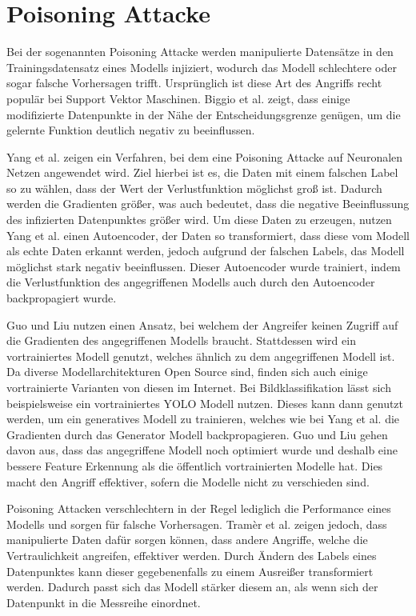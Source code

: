 \section{Poisoning Attacke}\label{sec:poisoning}

Bei der sogenannten Poisoning Attacke werden manipulierte Datensätze in den Trainingsdatensatz eines Modells injiziert, wodurch das Modell schlechtere oder sogar falsche Vorhersagen trifft.
Ursprünglich ist diese Art des Angriffs recht populär bei Support Vektor Maschinen.
Biggio et al. \cite{P-15} zeigt, dass einige modifizierte Datenpunkte in der Nähe der Entscheidungsgrenze genügen, um die gelernte Funktion deutlich negativ zu beeinflussen.

Yang et al. \cite{P-17} zeigen ein Verfahren, bei dem eine Poisoning Attacke auf Neuronalen Netzen angewendet wird.
Ziel hierbei ist es, die Daten mit einem falschen Label so zu wählen, dass der Wert der Verlustfunktion möglichst groß ist. 
Dadurch werden die Gradienten größer, was auch bedeutet, dass die negative Beeinflussung des infizierten Datenpunktes größer wird.
Um diese Daten zu erzeugen, nutzen Yang et al. \cite{P-17} einen Autoencoder, der Daten so transformiert, dass diese vom Modell als echte Daten erkannt werden, jedoch aufgrund der falschen Labels, das Modell möglichst stark negativ beeinflussen.
Dieser Autoencoder wurde trainiert, indem die Verlustfunktion des angegriffenen Modells auch durch den Autoencoder backpropagiert wurde.

Guo und Liu \cite{P-16} nutzen einen Ansatz, bei welchem der Angreifer keinen Zugriff auf die Gradienten des angegriffenen Modells braucht.
Stattdessen wird ein vortrainiertes Modell genutzt, welches ähnlich zu dem angegriffenen Modell ist. 
Da diverse Modellarchitekturen Open Source sind, finden sich auch einige vortrainierte Varianten von diesen im Internet.
Bei Bildklassifikation lässt sich beispielsweise ein vortrainiertes YOLO Modell nutzen.
Dieses kann dann genutzt werden, um ein generatives Modell zu trainieren, welches wie bei Yang et al. \cite{P-17} die Gradienten durch das Generator Modell backpropagieren.
Guo und Liu \cite{P-16} gehen davon aus, dass das angegriffene Modell noch optimiert wurde und deshalb eine bessere Feature Erkennung als die öffentlich vortrainierten Modelle hat.
Dies macht den Angriff effektiver, sofern die Modelle nicht zu verschieden sind.

Poisoning Attacken verschlechtern in der Regel lediglich die Performance eines Modells und sorgen für falsche Vorhersagen.
Tramèr et al. \cite{P-14} zeigen jedoch, dass manipulierte Daten dafür sorgen können, dass andere Angriffe, welche die Vertraulichkeit angreifen, effektiver werden.
Durch Ändern des Labels eines Datenpunktes kann dieser gegebenenfalls zu einem Ausreißer transformiert werden. 
Dadurch passt sich das Modell stärker diesem an, als wenn sich der Datenpunkt in die Messreihe einordnet.
